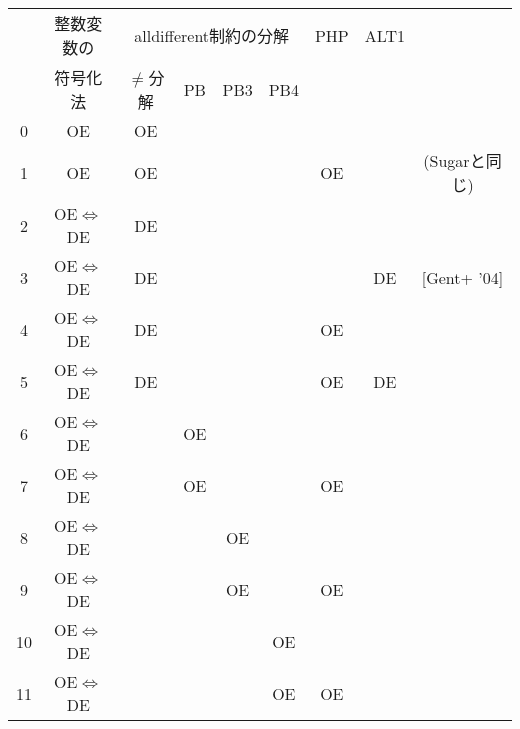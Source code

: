  \begin{tabular}[c] {c|c|c|c|c|c|c|c|c}
   & 整数変数の & \multicolumn{4}{|c|}{alldifferent制約の分解} & PHP & ALT1 \\\cline{3-6}
   & 符号化法   & $\neq$分解 & PB & PB3 & PB4 & & &\\\hline\hline
  0     & OE                    & OE      &    &       &             &     &     & \\
  1     & OE                    & OE      &    &       &             & OE  &     & (Sugarと同じ)\\\hline
  2     & OE$\Leftrightarrow$DE & DE      &    &       &             &     &     & \\
  3     & OE$\Leftrightarrow$DE & DE      &    &       &             &     & DE  & [Gent+ '04]\\
  4     & OE$\Leftrightarrow$DE & DE      &    &       &             & OE  &     & \\
  5     & OE$\Leftrightarrow$DE & DE      &    &       &             & OE  & DE  & \\
  6     & OE$\Leftrightarrow$DE &         & OE &       &             &     &     & \\
  7     & OE$\Leftrightarrow$DE &         & OE &       &             & OE  &     & \\
  8     & OE$\Leftrightarrow$DE &         &    & OE    &             &     &     & \\
  9     & OE$\Leftrightarrow$DE &         &    & OE    &             & OE  &     & \\
  10    & OE$\Leftrightarrow$DE &         &    &       & OE          &     &     & \\
  11    & OE$\Leftrightarrow$DE &         &    &       & OE          & OE  &     &
 \end{tabular}
